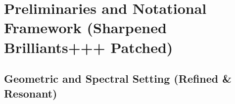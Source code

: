 
\chapter{Preliminaries and Notational Framework (Sharpened Brilliants+++ Patched)}
\label{chap:preliminaries-sharp-patched}

\section{Geometric and Spectral Setting (Refined \& Resonant)}
\label{sec:geom-spectral-setting-sharp-patched}

